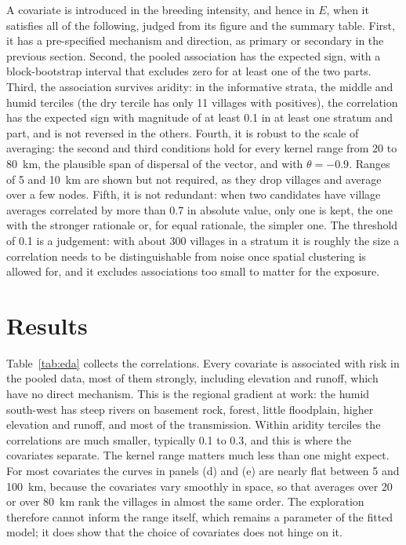 \documentclass[11pt,a4paper]{article}
\begin{document}
A covariate is introduced in the breeding intensity, and hence in $E$, when it satisfies all of the following, judged from its figure and the summary table. First, it has a pre-specified mechanism and direction, as primary or secondary in the previous section. Second, the pooled association has the expected sign, with a block-bootstrap interval that excludes zero for at least one of the two parts. Third, the association survives aridity: in the informative strata, the middle and humid terciles (the dry tercile has only 11 villages with positives), the correlation has the expected sign with magnitude of at least 0.1 in at least one stratum and part, and is not reversed in the others. Fourth, it is robust to the scale of averaging: the second and third conditions hold for every kernel range from 20 to 80~km, the plausible span of dispersal of the vector, and with $\theta = -0.9$. Ranges of 5 and 10~km are shown but not required, as they drop villages and average over a few nodes. Fifth, it is not redundant: when two candidates have village averages correlated by more than 0.7 in absolute value, only one is kept, the one with the stronger rationale or, for equal rationale, the simpler one. The threshold of 0.1 is a judgement: with about 300 villages in a stratum it is roughly the size a correlation needs to be distinguishable from noise once spatial clustering is allowed for, and it excludes associations too small to matter for the exposure.

\section{Results}

Table~\ref{tab:eda} collects the correlations. Every covariate is associated with risk in the pooled data, most of them strongly, including elevation and runoff, which have no direct mechanism. This is the regional gradient at work: the humid south-west has steep rivers on basement rock, forest, little floodplain, higher elevation and runoff, and most of the transmission. Within aridity terciles the correlations are much smaller, typically 0.1 to 0.3, and this is where the covariates separate. The kernel range matters much less than one might expect. For most covariates the curves in panels (d) and (e) are nearly flat between 5 and 100~km, because the covariates vary smoothly in space, so that averages over 20 or over 80~km rank the villages in almost the same order. The exploration therefore cannot inform the range itself, which remains a parameter of the fitted model; it does show that the choice of covariates does not hinge on it.
\end{document}
